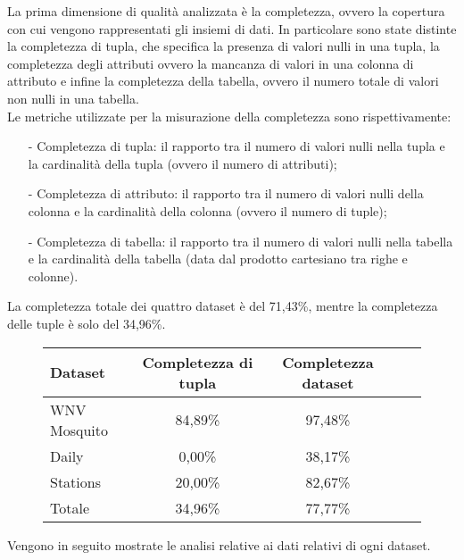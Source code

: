 La prima dimensione di qualità analizzata è la completezza, ovvero la copertura con cui vengono rappresentati gli insiemi di dati.
In particolare sono state distinte la completezza di tupla, che specifica la presenza di valori nulli in una tupla, la completezza degli attributi ovvero la mancanza di valori in una colonna di attributo e infine la completezza della tabella, ovvero il numero totale di valori non nulli in una tabella.\\

Le metriche utilizzate per la misurazione della completezza sono rispettivamente:\\
\begin{itemize}
		\item[-] Completezza di tupla: il rapporto tra il numero di valori nulli nella tupla e la cardinalità della tupla (ovvero il numero di attributi);
		\item[-] Completezza di attributo: il rapporto tra il numero di valori nulli della colonna e la cardinalità della colonna (ovvero il numero di tuple);
		\item[-] Completezza di tabella: il rapporto tra il numero di valori nulli nella tabella e la cardinalità della tabella (data dal prodotto cartesiano tra righe e colonne).
\end{itemize}


La completezza totale dei quattro dataset è del 71,43\%, mentre la completezza delle tuple è solo del 34,96\%.

\begin{figure}[H]
	\centering
	\begin{tabular}{lcccc}
		\toprule
		\textbf{Dataset} \quad & \textbf{Completezza di tupla} & \textbf{Completezza dataset} \\
		\midrule
		WNV Mosquito &		84,89\%  	& 97,48\%  \\ 
		Daily 		 &		 0,00\% 	& 38,17\%  \\ 
		Stations 	 &		20,00\% 	& 82,67\%  \\ 
		\midrule
		Totale &	    34,96\%      	& 77,77\%  \\
		\bottomrule
	\end{tabular}
	\label{tab:completezza totale}
\end{figure}

Vengono in seguito mostrate le analisi relative ai dati relativi di ogni dataset.


